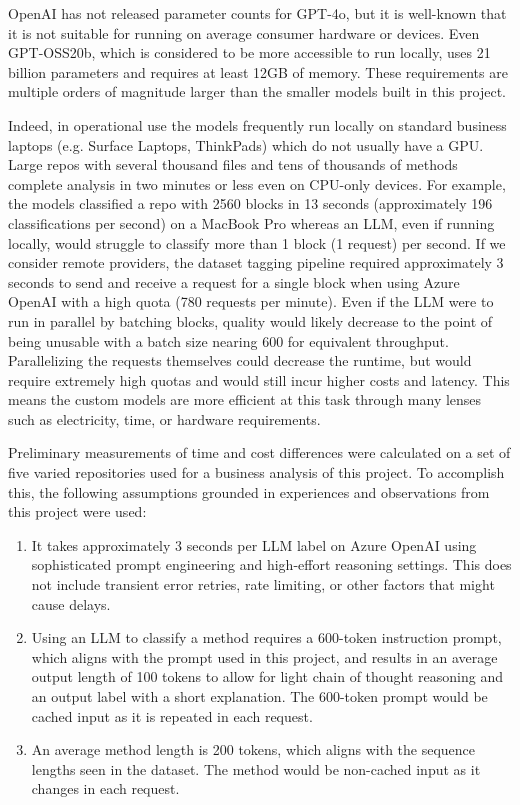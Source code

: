 \documentclass[11pt]{article}
\begin{document}
OpenAI has not released parameter counts for GPT-4o, but it is
well-known that it is not suitable for running on average consumer
hardware or devices. Even GPT-OSS20b, which is considered to be more
accessible to run locally, uses 21 billion parameters and requires at
least 12GB of memory. These requirements are multiple orders of
magnitude larger than the smaller models built in this project.

Indeed, in operational use the models frequently run locally on standard business
laptops (e.g. Surface Laptops, ThinkPads) which do not usually have a
GPU. Large repos with several thousand files and tens of thousands
of methods complete analysis in two minutes or less even on CPU-only
devices. For example, the models classified a repo with 2560 blocks in
13 seconds (approximately 196 classifications per second) on a MacBook Pro
whereas an LLM, even if running locally, would struggle to classify more
than 1 block (1 request) per second. If we consider remote providers,
the dataset tagging pipeline required approximately 3 seconds to send
and receive a request for a single block when using Azure OpenAI with a
high quota (780 requests per minute). Even if the LLM were to run in
parallel by batching blocks, quality would likely decrease to the point
of being unusable with a batch size nearing 600 for equivalent
throughput. Parallelizing the requests themselves could decrease the runtime, but would require extremely high quotas and would still incur higher costs and latency. This means the custom models are more efficient at this task
through many lenses such as electricity, time, or hardware requirements.

Preliminary measurements of time and cost differences were calculated on
a set of five varied repositories used for a business analysis of this
project. To accomplish this, the following assumptions grounded in
experiences and observations from this project were used:

\begin{enumerate}
\def\labelenumi{\arabic{enumi}.}
\item
  It takes approximately 3 seconds per LLM label on Azure OpenAI using
  sophisticated prompt engineering and high-effort reasoning settings.
  This does not include transient error retries, rate limiting, or other
  factors that might cause delays.
\item
  Using an LLM to classify a method requires a 600-token instruction
  prompt, which aligns with the prompt used in this project, and results in
  an average output length of 100 tokens to allow for light chain of
  thought reasoning and an output label with a short explanation. The
  600-token prompt would be cached input as it is repeated in each
  request.
\item
  An average method length is 200 tokens, which aligns with the sequence
  lengths seen in the dataset. The method would be non-cached input as
  it changes in each request.
\end{enumerate}
\end{document}
